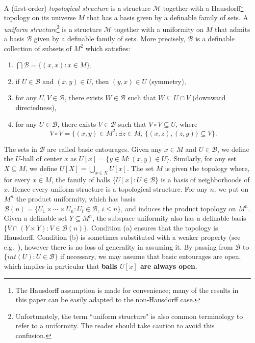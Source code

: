 \documentclass[12pt]{article}
\newcommand{\Bb}{\mathcal{B}}
\newcommand{\Mm}{\mathcal{M}}
\newcommand{\BU}{\Bb} %
\theoremstyle{definition}
\theoremstyle{remark}
\begin{document}

A (first-order) \emph{topological structure} is a structure $\Mm$ together with a Hausdorff\footnote{The Hausdorff assumption is made for convenience; many of the results in this paper can be easily adapted to the non-Hausdorff case.} topology on its universe $M$ that has a basis given by a definable family of sets. A \emph{uniform structure}\footnote{Unfortunately, the term ``uniform structure" is also common terminology to refer to a uniformity. The reader should take caution to avoid this confusion.} is a structure $\Mm$ together with a uniformity on $M$ that admits a basis $\BU$ given by a definable family of sets. More precisely, $\BU$ is a definable collection of subsets of $M^2$ which satisfies:
\begin{enumerate}[label=(\alph*)]
    \item $\bigcap \BU = \{ (x,x) : x\in M\}$,
    \item if $U\in \BU$ and $(x,y)\in U$, then $(y,x)\in U$ (symmetry), 
    \item for any $U, V\in \BU$, there exists $W\in \BU$ such that $W\subseteq U\cap V$ (downward directedness), 
    \item for any $U\in \BU$, there exists $V\in \BU$ such that $V\circ V\subseteq U$, where 
    $$V\circ V=\{ (x,y) \in M^2 : \exists z\in M,\, \{(x,z), (z,y)\}\subseteq V\}.$$ 
\end{enumerate}

The sets in $\BU$ are called basic entourages. Given any $x\in M$ and $U\in \BU$, we define the $U$-ball of center $x$ as $U[x]=\{ y\in M : (x,y)\in U\}$. Similarly, for any set $X\subseteq M$, we define $U[X]=\bigcup_{x\in X} U[x]$. The set $M$ is given the topology where, for every $x\in M$, the family of balls $\{ U[x] : U\in \BU\}$ is a basis of neighborhoods of $x$. Hence every uniform structure is a topological structure. For any $n$, we put on $M^n$ the product uniformity, which has basis $\Bb(n)=\{ U_1\times \cdots \times U_n : U_i\in \BU, \, i\leq n\}$, and induces the product topology on $M^n$. Given a definable set $Y\subseteq M^n$, the subspace uniformity also has a definable basis $\{ V \cap (Y\times Y) : V\in \Bb(n)\}$. Condition (a) ensures that the topology is Hausdorff. Condition (b) is sometimes substituted with a weaker property (see e.g.~\cite{dolich-good22}), however there is no loss of generality in assuming it. By passing from $\BU$ to $\{ int(U) : U\in \BU\}$ if necessary, we may assume that basic entourages are open, which implies in particular that \textbf{balls $U[x]$ are always open}.
\end{document}

